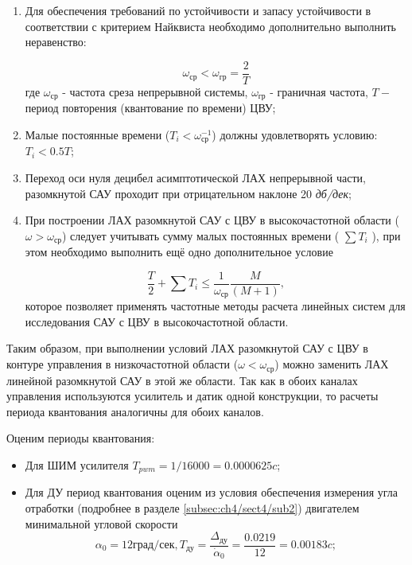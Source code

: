 \begin{enumerate}
	\item Для обеспечения требований по устойчивости и запасу устойчивости в соответствии с критерием Найквиста необходимо дополнительно выполнить неравенство:\par
	\begin{equation}%
	\label{eq:p4:418}
	\omega_{\textit{ср}}< \omega _{\textit{гр}}=\frac{2}{T}
	\end{equation}
	где  \(  \omega _{\textit{ср}}\) - частота среза непрерывной системы,  \(  \omega _{\textit{гр}}\) - граничная частота,  \( T- \) период повторения (квантование по времени) ЦВУ;	
	\item Малые постоянные времени ($T_i <  \omega_{\textit{ср}}^{-1}$) должны удовлетворять условию: $T_i < 0.5 T$;
	\item Переход оси нуля децибел асимптотической ЛАХ непрерывной части, разомкнутой САУ проходит при отрицательном наклоне 20 \textit{дб/дек};
	\item При построении ЛАХ разомкнутой САУ с ЦВУ в высокочастотной области  (\( \omega > \omega_{\textit{ср}} \)) следует учитывать сумму малых постоянных времени ( \(  \sum T_{i} \) ), при этом необходимо выполнить  ещё одно дополнительное условие\par	
	\begin{equation}%
	\label{eq:p4:419}
	\frac{T}{2}+ \sum T_{i} \leq \frac{1}{ \omega _{\textit{ср}}}\frac{M}{ \left( M+1 \right)},
	\end{equation}
	которое позволяет применять частотные методы расчета линейных систем для исследования САУ с ЦВУ в высокочастотной области.\par
\end{enumerate}

Таким образом, при выполнении условий  ЛАХ разомкнутой САУ с ЦВУ в контуре управления в низкочастотной области  (\(  \omega< \omega _{\textit{ср}} \))  можно заменить ЛАХ линейной разомкнутой САУ в этой же области. Так как в обоих каналах управления используются усилитель и датик одной конструкции, то расчеты периода квантования аналогичны для обоих каналов.


Оценим периоды квантования: 
\begin{itemize}
	\item Для ШИМ усилителя $T_{pwm} = 1/16000 = 0.0000625 c$;
	\item Для ДУ период квантования оценим из условия обеспечения измерения угла отработки (подробнее в разделе \ref{subsec:ch4/sect4/sub2}) двигателем минимальной угловой скорости
	\begin{equation}
	\alpha_0 = 12 \textit{град/сек}, T_{\textit{ду}} = \frac{\varDelta_{\textit{ду}}}{\dot \alpha_0}=
	\frac{0.0219}{12}=0.00183 c;
	\end{equation}	
\end{itemize}

